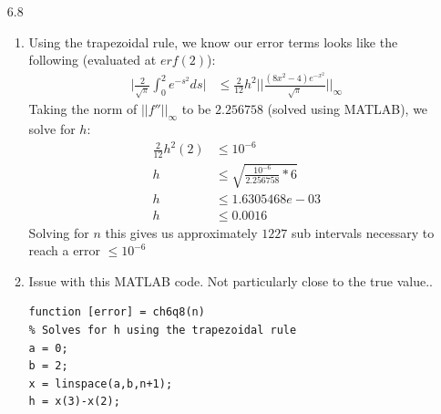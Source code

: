 \documentclass[11pt,a4paper]{article}
\begin{document}
\begin{itemize}
\begin{enumerate} [label={\alph*)}]
					\item We can use Simpson's rule to evaluate $u(1)$ since the number of intervals $n$ is even:
					\begin{align*}
					u(1) &= 0 + \frac{1}{4} \int_{0}^{1} T(s)ds\\
					u(1) &= 0 + \frac{1}{4} I_S \\
					u(1) &= 0 + \frac{1}{4}* \frac{1}{12}\Big((1)+4(-1)+2(2)+4(3)+(4)\Big)\\
					u(1) &= \frac{17}{48}
					\end{align*}
					\item If we use our result from part b we see $I_T = \frac{13}{8}$ and we use this in place of $I_T(2n)$. Following the theorem in the book we find that the Romberg Integration using the trapezoidal rule takes the form:
					$$\int_{a}^{b} f(x)dx = \frac{4}{3}I_T(2n)-\frac{1}{3}I_T(n)+O(h^3)$$
					Solving for $I_T(n)$ we get: 
					\begin{align*}
						I_T(n) &= \frac{1}{2}\Big(\frac{1}{2}(1) + (2) + \frac{1}{2}(4)\Big)\\
						I_T(n) &= \frac{9}{4}
					\end{align*}
					Putting it all together we see:
					\begin{align*}
						u(1) &= \frac{4}{3}(\frac{13}{8})-\frac{1}{3}(\frac{9}{4})\\
						u(1) &= \frac{17}{12}
					\end{align*}
					
				\end{enumerate}
				
			\item[6.8]
				\begin{enumerate} [label={\alph*)}]
					\item Using the trapezoidal rule, we know our error terms looks like the following (evaluated at $erf(2)$):
					\begin{align*}
						\Biggl \vert \frac{2}{\sqrt{\pi}} \int_{0}^{2}e^{-s^2}ds \Biggl\vert &\leq \frac{2}{12}h^2 \Big\vert \Big\vert \frac{(8x^2-4)e^{-x^2}}{\sqrt{\pi}} \Big\vert \Big\vert_\infty
					\end{align*}
					Taking the norm of $\vert \vert f'' \vert \vert_\infty$ to be $2.256758$ (solved using MATLAB), we solve for $h$:
					\begin{align*}
						\frac{2}{12}h^2 (2) &\leq 10^{-6}\\
						h &\leq \sqrt{\frac{10^{-6}}{2.256758}*6} \\
						h &\leq  1.6305468e-03 \\
						h &\leq 0.0016
					\end{align*}
					Solving for $n$ this gives us approximately $1227$ sub intervals necessary to reach a error $\leq 10^{-6}$ 
					\item Issue with this MATLAB code. Not particularly close to the true value..
							\begin{lstlisting}
function [error] = ch6q8(n)
% Solves for h using the trapezoidal rule
a = 0;
b = 2;
x = linspace(a,b,n+1);
h = x(3)-x(2);


\end{lstlisting}
\end{enumerate}
\end{itemize}
\end{document}
